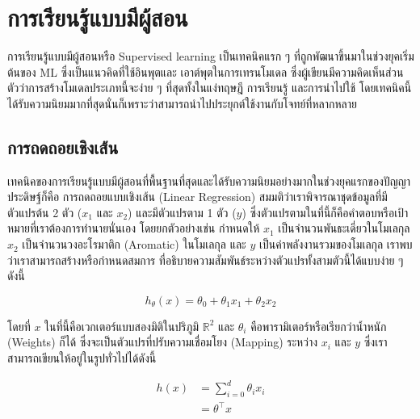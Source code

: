 

\chapter{การเรียนรู้แบบมีผู้สอน}
\label{ch:sup_ml}

การเรียนรู้แบบมีผู้สอนหรือ Supervised learning เป็นเทคนิคแรก ๆ ที่ถูกพัฒนาขึ้นมาในช่วงยุคเริ่มต้นของ ML ซึ่งเป็นแนวคิดที่ใช้อินพุตและ 
เอาต์พุตในการเทรนโมเดล ซึ่งผู้เขียนมีความคิดเห็นส่วนตัวว่าการสร้างโมเดลประเภทนี้จะง่าย ๆ ที่สุดทั้งในแง่ทฤษฎี การเรียนรู้ และการนำไปใช้ 
โดยเทคนิคนี้ได้รับความนิยมมากที่สุดนั่นก็เพราะว่าสามารถนำไปประยุกต์ใช้งานกับโจทย์ที่หลากหลาย

\section{การถดถอยเชิงเส้น}
\label{sec:lin_res}

เทคนิคของการเรียนรู้แบบมีผู้สอนที่พื้นฐานที่สุดและได้รับความนิยมอย่างมากในช่วงยุคแรกของปัญญาประดิษฐ์ก็คือ การถดถอยแบบเชิงเส้น 
(Linear Regression) สมมติว่าเราพิจารณาชุดข้อมูลที่มีตัวแปรต้น 2 ตัว ($x_{1}$ และ $x_{2}$) และมีตัวแปรตาม 1 ตัว ($y$) 
ซึ่งตัวแปรตามในที่นี้ก็คือคำตอบหรือเป้าหมายที่เราต้องการทำนายนั่นเอง โดยยกตัวอย่างเช่น กำหนดให้ $x_{1}$ เป็นจำนวนพันธะเดี่ยวในโมเลกุล 
$x_{2}$ เป็นจำนวนวงอะโรมาติก (Aromatic) ในโมเลกุล และ $y$ เป็นค่าพลังงานรวมของโมเลกุล เราพบว่าเราสามารถสร้างหรือกำหนดสมการ%
ที่อธิบายความสัมพันธ์ระหว่างตัวแปรทั้งสามตัวนี้ได้แบบง่าย ๆ ดังนี้

\begin{equation}
    h_\theta(x) = \theta_0 + \theta_1 x_1 + \theta_2 x_2
\end{equation}

\noindent โดยที่ $x$ ในที่นี้คือเวกเตอร์แบบสองมิติในปริภูมิ $\mathbb{R}^{2}$ และ $\theta_{i}$ คือพารามิเตอร์หรือเรียกว่าน้ำหนัก 
(Weights) ก็ได้ ซึ่งจะเป็นตัวแปรที่ปรับความเชื่อมโยง (Mapping) ระหว่าง $x_{i}$ และ $y$ ซึ่งเราสามารถเขียนให้อยู่ในรูปทั่วไปได้ดังนี้

\begin{align}
    h(x) &= \sum_{i=0}^{d} \theta_{i} x_{i} \\
         &= \theta^{\top} x
\end{align}

